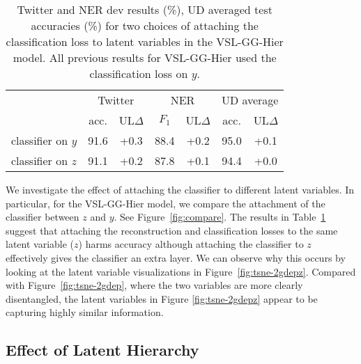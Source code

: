 \documentclass[11pt,a4paper]{article}
\newcommand{\vsmgghier}{VSL-GG-Hier\xspace}
\begin{document}
\begin{table}[t]
\setlength{\tabcolsep}{4pt}
\centering
\small
\begin{tabular}{l|c|c|c|c|c|c}
        & \multicolumn{2}{c|}{Twitter} & \multicolumn{2}{c|}{NER} & \multicolumn{2}{c}{UD average} \\
        & \multicolumn{1}{c}{acc.} & UL$\Delta$ & \multicolumn{1}{c}{$F_{1}$} & UL$\Delta$ & \multicolumn{1}{c}{acc.} & UL$\Delta$ \\
\hline

classifier on $y$ & 91.6 & +0.3 & 88.4 & +0.2 & 95.0 & +0.1\\

classifier on $z$ & 91.1 & +0.2 & 87.8 & +0.1 & 94.4 & +0.0 \\

\end{tabular}
\caption{Twitter and NER dev results (\%), UD averaged test accuracies (\%) for two choices of attaching the classification loss to latent variables in the \vsmgghier model. All previous results for \vsmgghier used the classification loss on $y$.}
\label{compare-multitask-loss}
\end{table}

We investigate the effect of attaching the classifier to different latent variables. In particular, for the \vsmgghier model, we compare the attachment of the classifier between $z$ and $y$. See Figure~\ref{fig:compare}. The results in Table~\ref{compare-multitask-loss} suggest that attaching the reconstruction and classification losses to the same latent variable ($z$) harms accuracy although attaching the classifier to $z$ effectively gives the classifier an extra layer.
We can observe why this occurs by looking at the latent variable visualizations in Figure~\ref{fig:tsne-2gdepz}. Compared with Figure~\ref{fig:tsne-2gdep}, where the two variables are more clearly disentangled, the latent variables in Figure \ref{fig:tsne-2gdepz} appear to be capturing highly similar information.

\subsection{Effect of Latent Hierarchy}
\label{subsec:discuss-latent-hierarchy}
\end{document}
